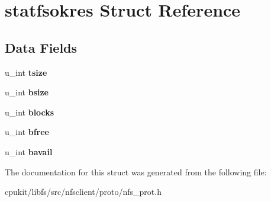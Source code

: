 \hypertarget{structstatfsokres}{}\section{statfsokres Struct Reference}
\label{structstatfsokres}
\subsection*{Data Fields}
\begin{DoxyCompactItemize}
\item 
\mbox{\label{structstatfsokres_a4774229ad59230602f470208bc690e0f}} 
u\+\_\+int {\bfseries tsize}
\item 
\mbox{\label{structstatfsokres_a4771f29e223f4dc1eedfc2360a383b58}} 
u\+\_\+int {\bfseries bsize}
\item 
\mbox{\label{structstatfsokres_acbff6ba6d8295cef615919ee31e616e9}} 
u\+\_\+int {\bfseries blocks}
\item 
\mbox{\label{structstatfsokres_ad6eda85fd59918113c27ff58a45a5489}} 
u\+\_\+int {\bfseries bfree}
\item 
\mbox{\label{structstatfsokres_ada3e4c43a6c82b889769d3ad1ae359be}} 
u\+\_\+int {\bfseries bavail}
\end{DoxyCompactItemize}


The documentation for this struct was generated from the following file\+:\begin{DoxyCompactItemize}
\item 
cpukit/libfs/src/nfsclient/proto/nfs\+\_\+prot.\+h\end{DoxyCompactItemize}
